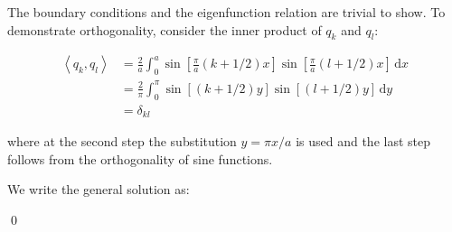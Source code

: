 \documentclass[12pt]{article}
\begin{document}

The boundary conditions and the eigenfunction relation are trivial to show. To demonstrate orthogonality, consider the inner product of $q_{k}$ and $q_{l}$:

\begin{equation}
    \begin{split}
        \left\langle q_{k}, q_{l} \right\rangle &= \frac{2}{a} \int_{0}^{a} \sin{\left[ \frac{\pi}{a} (k + 1/2) x \right]} \sin{\left[ \frac{\pi}{a} (l + 1/2) x \right]} \, \mathrm{d}x \\
        &= \frac{2}{\pi} \int_{0}^{\pi} \sin{\left[ (k + 1/2) y \right]} \sin{\left[ (l + 1/2) y \right]} \, \mathrm{d}y \\
        &= \delta_{kl}
    \end{split}
\end{equation}

where at the second step the substitution $y = \pi x/a$ is used and the last step follows from the orthogonality of sine functions.

We write the general solution as:

\qed
\end{document}
